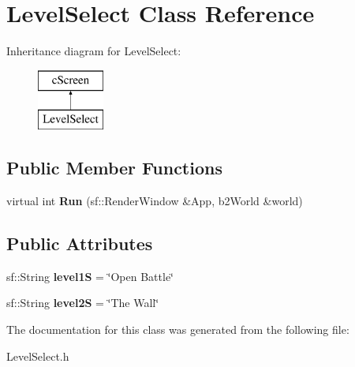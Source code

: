 \hypertarget{class_level_select}{}\section{Level\+Select Class Reference}
\label{class_level_select}
Inheritance diagram for Level\+Select\+:\begin{figure}[H]
\begin{center}
\leavevmode
\includegraphics[height=2.000000cm]{class_level_select}
\end{center}
\end{figure}
\subsection*{Public Member Functions}
\begin{DoxyCompactItemize}
\item 
virtual int {\bfseries Run} (sf\+::\+Render\+Window \&App, b2\+World \&world)\hypertarget{class_level_select_a146b7eb2efd96684c7eca486c97fe9b8}{}\label{class_level_select_a146b7eb2efd96684c7eca486c97fe9b8}

\end{DoxyCompactItemize}
\subsection*{Public Attributes}
\begin{DoxyCompactItemize}
\item 
sf\+::\+String {\bfseries level1S} = \char`\"{}Open Battle\char`\"{}\hypertarget{class_level_select_a68ca4b301e1409b2cdeba4a81c0a4945}{}\label{class_level_select_a68ca4b301e1409b2cdeba4a81c0a4945}

\item 
sf\+::\+String {\bfseries level2S} = \char`\"{}The Wall\char`\"{}\hypertarget{class_level_select_a5951dfe87201cfcd09f6e4af5049d482}{}\label{class_level_select_a5951dfe87201cfcd09f6e4af5049d482}

\end{DoxyCompactItemize}


The documentation for this class was generated from the following file\+:\begin{DoxyCompactItemize}
\item 
Level\+Select.\+h\end{DoxyCompactItemize}
